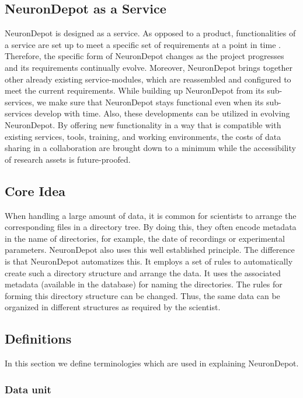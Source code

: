 \documentclass{frontiersSCNS} %
\begin{document}
\subsection{NeuronDepot as a Service}
\label{sec:service}
NeuronDepot is designed as a service. As opposed to a product, functionalities
of a service are set up to meet a specific set of requirements at a point in
time \citep{truex_growing_1999, bennett_service-based_2000,
bullinger_service_2003}. Therefore, the specific form of NeuronDepot changes as
the project progresses and its requirements continually evolve. Moreover,
NeuronDepot brings together other already existing service-modules, which are
reassembled and configured to meet the current requirements. While building up
NeuronDepot from its sub-services, we make sure that NeuronDepot stays
functional even when its sub-services develop with time.  Also, these
developments can be utilized in evolving NeuronDepot. By offering new
functionality in a way that is compatible with existing services, tools,
training, and working environments, the costs of data sharing in a
collaboration are brought down to a minimum while the accessibility of research
assets is future-proofed.

\subsection{Core Idea}

When handling a large amount of data, it is common for scientists to arrange
the corresponding files in a directory tree. By doing this, they often encode
metadata in the name of directories, for example, the date of recordings or
experimental parameters. NeuronDepot also uses this well established principle.
The difference is that NeuronDepot automatizes this. It employs a set of rules
to automatically create such a directory structure and arrange the data. It
uses the associated metadata (available in the database) for naming the
directories. The rules for forming this directory structure can be changed.
Thus, the same data can be organized in different structures as required by the
scientist.

\subsection{Definitions}

In this section we define terminologies which are used in explaining
NeuronDepot.

\subsubsection{Data unit}
\end{document}
